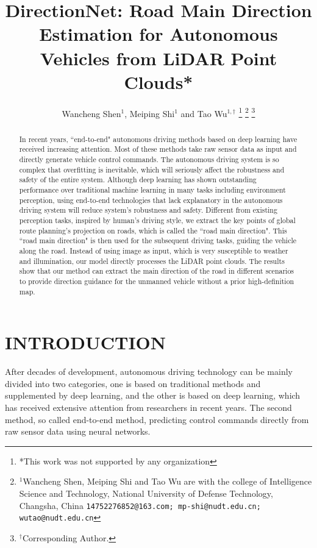 \documentclass[letterpaper,10 pt,conference]{ieeeconf}  %
\title{\LARGE \bf
DirectionNet: Road Main Direction Estimation for Autonomous Vehicles from LiDAR Point Clouds*
}
\author{Wancheng Shen$^{1}$, Meiping Shi$^1$ and Tao Wu$^{1, \dag}$%
\thanks{*This work was not supported by any organization}%
\thanks{$^{1}$Wancheng Shen, Meiping Shi and Tao Wu are with the college of Intelligence Science and Technology, National University of Defense Technology, Changsha, China
        {\tt\small 14752276852@163.com; mp-shi@nudt.edu.cn; wutao@nudt.edu.cn}}%
\thanks{$^\dag$Corresponding Author.}
}
\begin{document}


\maketitle
\thispagestyle{empty}
\pagestyle{empty}


\begin{abstract}

In recent years, ``end-to-end" autonomous driving methods based on deep learning have received increasing attention. Most of these methods take raw sensor data as input and directly generate vehicle control commands. The autonomous driving system is so complex that overfitting is inevitable, which will seriously affect the robustness and safety of the entire system. Although deep learning has shown outstanding performance over traditional machine learning in many tasks including environment perception, using end-to-end technologies that lack explanatory in the autonomous driving system will reduce system's robustness and safety. Different from existing perception tasks, inspired by human's driving style, we extract the key points of global route planning's projection on roads, which is called the ``road main direction". This ``road main direction" is then used for the subsequent driving tasks, guiding the vehicle along the road. Instead of using image as input, which is very susceptible to weather and illumination, our model directly processes the LiDAR point clouds. The results show that our method can extract the main direction of the road in different scenarios to provide direction guidance for the unmanned vehicle without a prior high-definition map.

\end{abstract}


\section{INTRODUCTION}

After decades of development, autonomous driving technology can be mainly divided into two categories, one is based on traditional methods and supplemented by deep learning, and the other is based on deep learning, which has received extensive attention from researchers in recent years. The second method, so called end-to-end method, predicting control commands directly from raw sensor data using neural networks\cite{1,2,3,4,5}.
\end{document}
